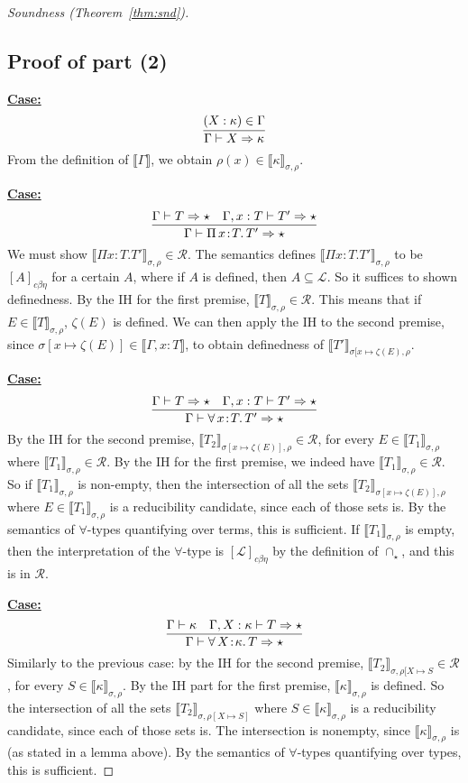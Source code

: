 \documentclass{article}
\newcommand{\choice}[0]{\zeta}
\newcommand{\elcap}[0]{\cap}
\newcommand{\abs}[4]{{#1}\, #2\! : \! #3.\, #4}
\newcommand{\interp}[1]{\llbracket #1 \rrbracket}
\newcommand{\tpsynth}[0]{\Rightarrow}
\newcommand{\cbe}[0]{c\beta\eta}
\newcommand{\startcase}[1]{\vspace{#1} \noindent\textbf{\underline{Case:}}}
\begin{document}
\begin{proof}[Soundness (Theorem~\ref{thm:snd})]
\subsection{Proof of part (2)}

\startcase{.2cm}
\[
\infer{\Gamma \vdash X \tpsynth \kappa}{(X : \kappa) \in \Gamma} 
\]
From the definition of $\interp{\Gamma}$, we obtain
$\rho(x)\in\interp{\kappa}_{\sigma,\rho}$.

\startcase{.2cm}
\[
   \infer{\Gamma\vdash\abs{\Pi}{x}{T}{T'} \tpsynth \star}{\Gamma \vdash T \tpsynth \star & \Gamma,x:T\vdash T' \tpsynth \star} 
\]
We must show $\interp{\Pi x:T.T'}_{\sigma,\rho}\in\mathcal{R}$. The
semantics defines $\interp{\Pi x:T.T'}_{\sigma,\rho}$ to be
$[A]_{\cbe}$ for a certain $A$, where if $A$ is defined, then
$A\subseteq\mathcal{L}$.  So it suffices to shown definedness. By the IH
for the first premise, $\interp{T}_{\sigma,\rho}\in\mathcal{R}$.  This
means that if $E\in\interp{T}_{\sigma,\rho}$, $\choice(E)$ is defined.
We can then apply the IH to the second premise, since
$\sigma[x\mapsto\choice(E)]\in\interp{\Gamma,x:T}$, to obtain
definedness of $\interp{T'}_{\sigma[x\mapsto\choice(E),\rho}$.


\startcase{.2cm}
\[
   \infer{\Gamma\vdash\abs{\forall}{x}{T}{T'} \tpsynth \star}{\Gamma \vdash T \tpsynth \star & \Gamma,x:T\vdash T' \tpsynth \star} 
\]
By the IH for the second premise, $\interp{T_2}_{\sigma[x\mapsto  \choice(E)],\rho}\in\mathcal{R}$, for every
$E\in\interp{T_1}_{\sigma,\rho}$ where
$\interp{T_1}_{\sigma,\rho}\in\mathcal{R}$.  By the IH for the first
premise, we indeed have $\interp{T_1}_{\sigma,\rho}\in\mathcal{R}$.
So if $\interp{T_1}_{\sigma,\rho}$ is non-empty, then the intersection of all the sets
$\interp{T_2}_{\sigma[x\mapsto \choice(E)],\rho}$ where $E\in\interp{T_1}_{\sigma,\rho}$ is a
reducibility candidate, since each of those sets is.  By the semantics
of $\forall$-types quantifying over terms, this is sufficient.  If $\interp{T_1}_{\sigma,\rho}$ is
empty, then the interpretation of the $\forall$-type is $[\mathcal{L}]_{\cbe}$ by the definition
of $\elcap_\star$, and this is in $\mathcal{R}$.

\startcase{.2cm}
\[
    \infer{\Gamma\vdash \abs{\forall}{X}{\kappa}{T} \tpsynth \star}{\Gamma \vdash \kappa & \Gamma,X:\kappa\vdash T \tpsynth \star} 
\]
Similarly to the previous case: by the IH for the second premise,
$\interp{T_2}_{\sigma,\rho[X\mapsto S}\in\mathcal{R}$, for every
$S\in\interp{\kappa}_{\sigma,\rho}$.  By the IH part for the first
premise, $\interp{\kappa}_{\sigma,\rho}$ is defined.  So the
intersection of all the sets $\interp{T_2}_{\sigma,\rho[X\mapsto S]}$
where $S\in\interp{\kappa}_{\sigma,\rho}$ is a reducibility candidate,
since each of those sets is.  The intersection is nonempty, since $\interp{\kappa}_{\sigma,\rho}$ is (as stated in a lemma above).
By the semantics of $\forall$-types
quantifying over types, this is sufficient. 


\end{proof}
\end{document}
